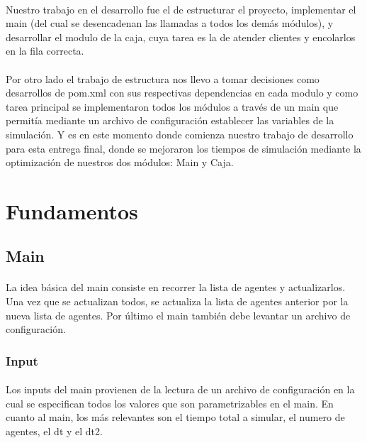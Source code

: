 \documentclass{article}
\begin{document}
\paragraph{}
Nuestro trabajo en el desarrollo fue el de estructurar el proyecto, implementar el main (del cual se desencadenan las llamadas a todos los demás módulos),  y desarrollar el modulo de la caja, cuya tarea es la  de atender clientes y encolarlos en la fila correcta.

\paragraph{}
Por otro lado el trabajo de estructura nos llevo a tomar decisiones como desarrollos de pom.xml con sus respectivas dependencias en cada modulo y como tarea principal se implementaron todos los módulos a través de un main que permitía mediante un archivo de configuración establecer las variables de la simulación. Y es en este momento donde comienza nuestro trabajo de desarrollo para esta entrega final, donde se mejoraron los tiempos de simulación mediante la optimización de nuestros dos módulos: Main y Caja.

\section{Fundamentos}

\subsection{Main}

\paragraph{}
La idea básica del main consiste en recorrer la lista de agentes y actualizarlos. Una vez que se actualizan todos, se actualiza la lista de agentes anterior por la nueva lista de agentes. Por último el main también debe levantar un archivo de configuración.

\subsubsection{Input}

\paragraph{}

Los inputs del main provienen de la lectura de un archivo de configuración en la cual se especifican todos los valores que son parametrizables en el main. En cuanto al main, los más relevantes son el tiempo total a simular, el numero de agentes, el dt  y el dt2.
\end{document}
